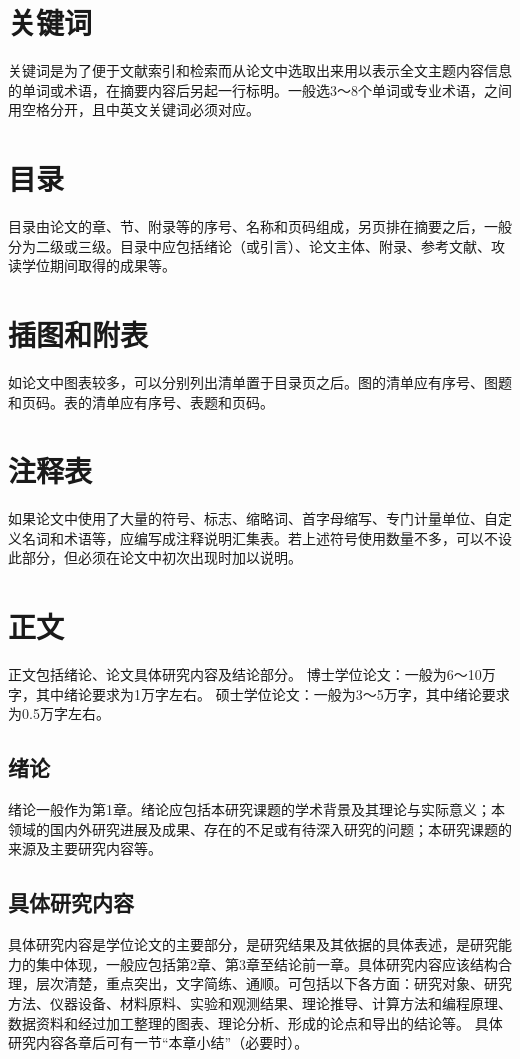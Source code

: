 \section{关键词}
关键词是为了便于文献索引和检索而从论文中选取出来用以表示全文主题内容信息的单词或术语，在摘要内容后另起一行标明。一般选3～8个单词或专业术语，之间用空格分开，且中英文关键词必须对应。

\section{目录}
目录由论文的章、节、附录等的序号、名称和页码组成，另页排在摘要之后，一般分为二级或三级。目录中应包括绪论（或引言）、论文主体、附录、参考文献、攻读学位期间取得的成果等。

\section{插图和附表}
如论文中图表较多，可以分别列出清单置于目录页之后。图的清单应有序号、图题和页码。表的清单应有序号、表题和页码。

\section{注释表}
如果论文中使用了大量的符号、标志、缩略词、首字母缩写、专门计量单位、自定义名词和术语等，应编写成注释说明汇集表。若上述符号使用数量不多，可以不设此部分，但必须在论文中初次出现时加以说明。

\section{正文}
正文包括绪论、论文具体研究内容及结论部分。
博士学位论文：一般为6～10万字，其中绪论要求为1万字左右。
硕士学位论文：一般为3～5万字，其中绪论要求为0.5万字左右。

\subsection{绪论}
绪论一般作为第1章。绪论应包括本研究课题的学术背景及其理论与实际意义；本领域的国内外研究进展及成果、存在的不足或有待深入研究的问题；本研究课题的来源及主要研究内容等。

\subsection{具体研究内容}
具体研究内容是学位论文的主要部分，是研究结果及其依据的具体表述，是研究能力的集中体现，一般应包括第2章、第3章至结论前一章。具体研究内容应该结构合理，层次清楚，重点突出，文字简练、通顺。可包括以下各方面：研究对象、研究方法、仪器设备、材料原料、实验和观测结果、理论推导、计算方法和编程原理、数据资料和经过加工整理的图表、理论分析、形成的论点和导出的结论等。
具体研究内容各章后可有一节“本章小结”（必要时）。

